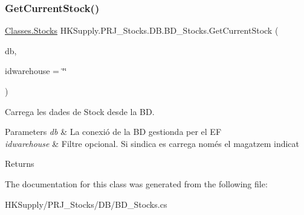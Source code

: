 \subsubsection{\texorpdfstring{Get\+Current\+Stock()}{GetCurrentStock()}}
{\footnotesize\ttfamily \mbox{\hyperlink{class_h_k_supply_1_1_p_r_j___stocks_1_1_classes_1_1_stocks}{Classes.\+Stocks}} H\+K\+Supply.\+P\+R\+J\+\_\+\+Stocks.\+D\+B.\+B\+D\+\_\+\+Stocks.\+Get\+Current\+Stock (\begin{DoxyParamCaption}\item[{\mbox{\hyperlink{class_h_k_supply_1_1_d_b_1_1_h_k_supply_context}{H\+K\+Supply\+Context}}}]{db,  }\item[{string}]{idwarehouse = {\ttfamily \char`\"{}\char`\"{}} }\end{DoxyParamCaption})}



Carrega les dades de Stock desde la BD. 


\begin{DoxyParams}{Parameters}
{\em db} & La conexió de la BD gestionda per el EF\\
\hline
{\em idwarehouse} & Filtre opcional. Si s\textquotesingle{}indica es carrega només el magatzem indicat\\
\hline
\end{DoxyParams}
\begin{DoxyReturn}{Returns}

\end{DoxyReturn}


The documentation for this class was generated from the following file\+:\begin{DoxyCompactItemize}
\item 
H\+K\+Supply/\+P\+R\+J\+\_\+\+Stocks/\+D\+B/B\+D\+\_\+\+Stocks.\+cs\end{DoxyCompactItemize}
